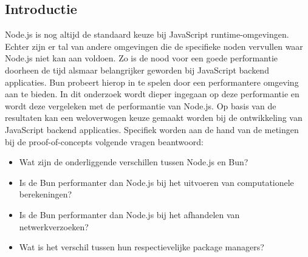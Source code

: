 \documentclass[a0,portrait]{hogent-poster}
\begin{document}
\begin{multicols}{2} %

\section{Introductie}
Node.js is nog altijd de standaard keuze bij JavaScript runtime-omgevingen. 
Echter zijn er tal van andere omgevingen die de specifieke noden vervullen waar Node.js niet kan aan voldoen.
Zo is de nood voor een goede performantie doorheen de tijd alsmaar belangrijker geworden bij JavaScript backend applicaties.
Bun probeert hierop in te spelen door een performantere omgeving aan te bieden. 
In dit onderzoek wordt dieper ingegaan op deze performantie en wordt deze vergeleken met de performantie van Node.js.
Op basis van de resultaten kan een weloverwogen keuze gemaakt worden bij de ontwikkeling van JavaScript backend applicaties.
Specifiek worden aan de hand van de metingen bij de proof-of-concepts volgende vragen beantwoord:
\begin{itemize}
  \item Wat zijn de onderliggende verschillen tussen Node.js en Bun?
  \item Is de Bun performanter dan Node.js bij het uitvoeren van computationele berekeningen?
  \item Is de Bun performanter dan Node.js bij het afhandelen van netwerkverzoeken?
  \item Wat is het verschil tussen hun respectievelijke package managers?
\end{itemize}

\end{multicols}
\end{document}
